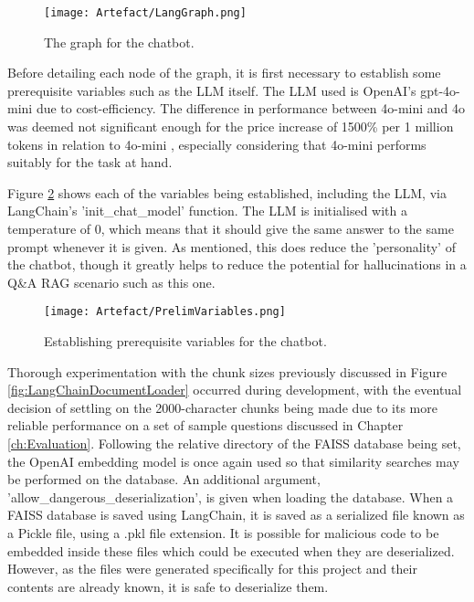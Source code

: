 \begin{figure}[H]
    \centering
    \texttt{[image: Artefact/LangGraph.png]}
    \caption{The graph for the chatbot. \label{fig:ChatbotLangGraph}}
\end{figure}


\para Before detailing each node of the graph, it is first necessary to establish some prerequisite variables such as the LLM itself. 
The LLM used is OpenAI's gpt-4o-mini due to cost-efficiency. The difference in performance between 4o-mini and 4o was deemed not significant 
enough for the price increase of 1500\% per 1 million tokens in relation to 4o-mini \autocite{openaiPricing}, especially considering that 4o-mini
performs suitably for the task at hand.

\para Figure \ref{fig:PrelimVariables} shows each of the variables being established, including the LLM, 
via LangChain's 'init\_chat\_model' function. The LLM is initialised with a temperature of 0, which means that it should give the same 
answer to the same prompt whenever it is given. As mentioned, this does reduce the 'personality' of the chatbot, though it greatly helps 
to reduce the potential for hallucinations in a Q\&A RAG scenario such as this one.

\begin{figure}[H]
    \centering
    \texttt{[image: Artefact/PrelimVariables.png]}
    \caption{Establishing prerequisite variables for the chatbot. \label{fig:PrelimVariables}}
\end{figure}

\noindent Thorough experimentation with the chunk sizes previously discussed in Figure \ref{fig:LangChainDocumentLoader} occurred during 
development, with the eventual decision of settling on the 2000-character chunks being made due to its more reliable performance on a set 
of sample questions discussed in Chapter \ref{ch:Evaluation}. Following the relative directory of the FAISS database being set, the 
OpenAI embedding model is once again used so that similarity searches may be performed on the database. An additional argument,
'allow\_dangerous\_deserialization', is given when loading the database. When a FAISS database is saved using LangChain, it is saved as a 
serialized file known as a Pickle file, using a .pkl file extension. It is possible for malicious code to be embedded inside these files
which could be executed when they are deserialized. However, as the files were generated specifically for this project and their contents 
are already known, it is safe to deserialize them.

